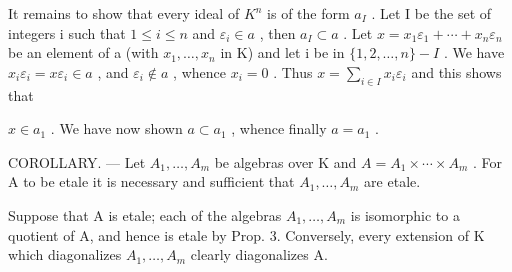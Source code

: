 It remains to show that every ideal of \(K^{n}\) is of the form \(a_{I}\) . Let I be the set of integers i such that \(1 \leqslant i \leqslant n\) and \(\varepsilon_{i} \in a\) , then \(a_{I} \subset a\) . Let \(x = x_{1}\varepsilon_{1} + \cdots + x_{n}\varepsilon_{n}\) be an element of a (with \(x_{1}, \ldots, x_{n}\) in K) and let i be in \(\{1, 2, \ldots, n\} - I\) . We have \(x_{i}\varepsilon_{i} = x\varepsilon_{i} \in a\) , and \(\varepsilon_{i} \notin a\) , whence \(x_{i} = 0\) . Thus \(x = \sum_{i \in I} x_{i}\varepsilon_{i}\) and this shows that

\(x \in a_{1}\) . We have now shown \(a \subset a_{1}\) , whence finally \(a = a_{1}\) .

COROLLARY. --- Let \(A_{1}, \ldots, A_{m}\) be algebras over K and \(A = A_{1} \times \cdots \times A_{m}\) . For A to be etale it is necessary and sufficient that \(A_{1}, \ldots, A_{m}\) are etale.

Suppose that A is etale; each of the algebras \(A_{1}, \ldots, A_{m}\) is isomorphic to a quotient of A, and hence is etale by Prop. 3. Conversely, every extension of K which diagonalizes \(A_{1}, \ldots, A_{m}\) clearly diagonalizes A.

